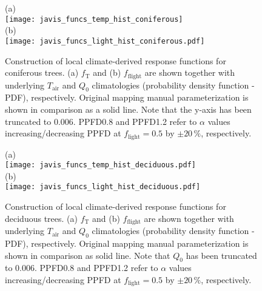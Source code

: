 \documentclass[bg, manuscript]{copernicus}
\begin{document}
\begin{figure}[t]
  \centering
  (a)\\
  \texttt{[image: javis\_funcs\_temp\_hist\_coniferous]}\\
  (b)\\
  \texttt{[image: javis\_funcs\_light\_hist\_coniferous.pdf]}
\caption{Construction of local climate-derived response functions for coniferous trees. (a) $f_\mathrm{T}$ and (b) $f_\mathrm{flight}$ are shown together with underlying $T_\mathrm{air}$ and $Q_0$ climatologies (probability density function - PDF), respectively. Original mapping manual parameterization is shown in comparison as a solid line. Note that the y-axis has been truncated to $0.006$. PPFD0.8 and PPFD1.2 refer to $\alpha$ values increasing/decreasing PPFD at $f_\mathrm{light}=0.5$ by $\pm 20\,\%$, respectively.}
\label{fig:f_temp_spruce}
\end{figure}

\begin{figure}[t]
  \centering
  (a)\\
  \texttt{[image: javis\_funcs\_temp\_hist\_deciduous.pdf]}\\
  (b)\\
  \texttt{[image: javis\_funcs\_light\_hist\_deciduous.pdf]}
\caption{Construction of local climate-derived response functions for deciduous trees. (a) $f_\mathrm{T}$ and (b) $f_\mathrm{flight}$ are shown together with underlying $T_\mathrm{air}$ and $Q_0$ climatologies (probability density function - PDF), respectively. Original mapping manual parameterization is shown in comparison as solid line. Note that $Q_0$ has been truncated to $0.006$. PPFD0.8 and PPFD1.2 refer to $\alpha$ values increasing/decreasing PPFD at $f_\mathrm{light}=0.5$ by $\pm 20\,\%$, respectively.}
\label{fig:f_temp_birch}
\end{figure}

\clearpage

\noappendix       %


\end{document}

